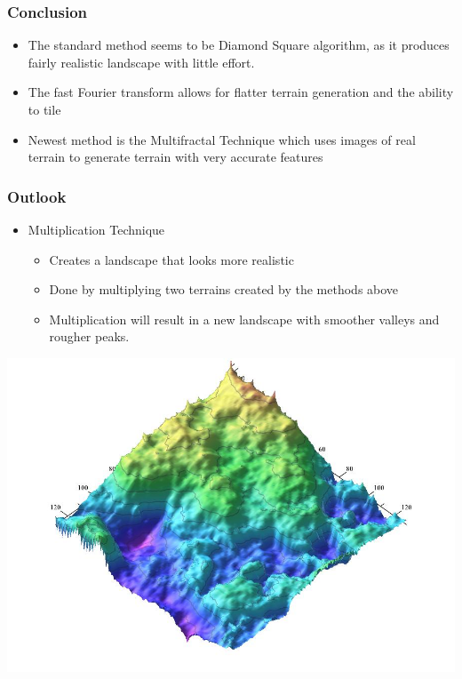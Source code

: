 \documentclass{beamer}
\begin{document}
\begin{frame}
 \frametitle{Conclusion}
\begin{itemize}
  \item The standard method seems to be Diamond Square algorithm, as it produces fairly realistic landscape with little effort.
  \item The fast Fourier transform allows for flatter terrain generation and the ability to tile
 \item Newest method is the Multifractal Technique which uses images of real terrain to generate terrain with very accurate features
  \end{itemize}
  \end{frame}
  
  \begin{frame}
  \frametitle{Outlook}
  \begin{itemize}
    \item Multiplication Technique
    \begin{itemize}
    \item Creates a landscape that looks more realistic 
    \item Done by multiplying two terrains created by the methods above
    \item Multiplication will result in a new landscape with smoother valleys and rougher peaks.
    \end{itemize}
    \end{itemize}
    \begin{center}
    \includegraphics[scale=0.2]{multipliedterrain.jpg}
    \end{center}
\end{frame}
\end{document}
